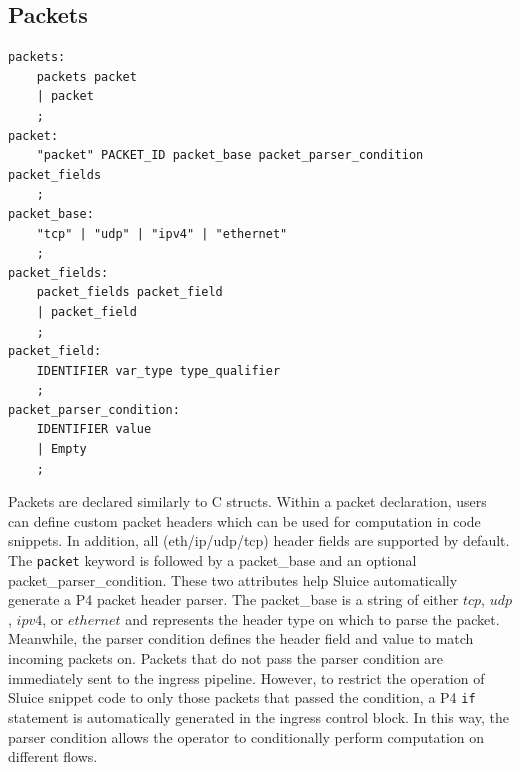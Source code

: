 \documentclass[12pt, oneside]{article}
\begin{document}
\subsection{Packets}
\begin{lstlisting}[basicstyle=\linespread{1.3}\scriptsize,  numberstyle=\tiny, backgroundcolor = \color{teagreen}, frame=tlrb]
packets:
	packets packet
	| packet
	;
packet:
	"packet" PACKET_ID packet_base packet_parser_condition packet_fields
	;
packet_base:
	"tcp" | "udp" | "ipv4" | "ethernet"
	;
packet_fields:
	packet_fields packet_field
	| packet_field
	;
packet_field:
	IDENTIFIER var_type type_qualifier
	;
packet_parser_condition:
	IDENTIFIER value
	| Empty
	;
\end{lstlisting}

Packets are declared similarly to C structs. Within a packet declaration, users can define custom packet headers which can be used for computation in code snippets. In addition, all (eth/ip/udp/tcp) header fields are supported by default. The \texttt{packet} keyword is followed by a packet\_base and an optional packet\_parser\_condition. These two attributes help Sluice automatically generate a P4 packet header parser. The packet\_base is a string of either $tcp$, $udp$, $ipv4$, or $ethernet$ and represents the header type on which to parse the packet.  Meanwhile, the parser condition defines the header field and value to match incoming packets on. Packets that do not pass the parser condition are immediately sent to the ingress pipeline. However, to restrict the operation of Sluice snippet code to only those packets that passed the condition, a P4 \texttt{if} statement is automatically generated in the ingress control block. In this way, the parser condition allows the operator to conditionally perform computation on different flows.
\end{document}
